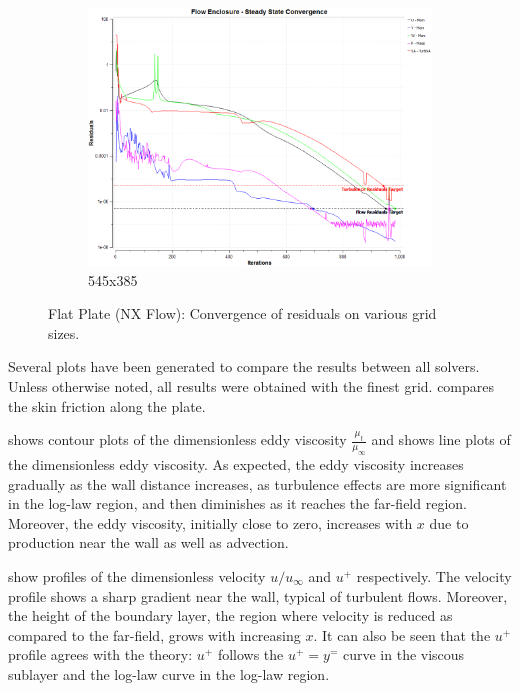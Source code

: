 \begin{figure}[ht!]
\begin{subfigure}{0.48\textwidth}
        \includegraphics[width=\textwidth]{./figs/flatnx/545x385_conv.png}
        \caption{545x385}
    \end{subfigure}
    \caption{Flat Plate (NX Flow): Convergence of residuals on various grid sizes.}
    \label{fig:nxflatcnvstudy}
\end{figure}

Several plots have been generated to compare the results between all solvers. Unless otherwise noted, all results were obtained with the finest grid.  compares the skin friction along the plate. 

 shows contour plots of the dimensionless eddy viscosity $\frac{\mu_t}{\mu_{\infty}}$ and  shows line plots of the dimensionless eddy viscosity. As expected, the eddy viscosity increases gradually as the wall distance increases, as turbulence effects are more significant in the log-law region, and then diminishes as it reaches the far-field region. Moreover, the eddy viscosity, initially close to zero, increases with $x$ due to production near the wall as well as advection.

 show profiles of the dimensionless velocity $u/u_\infty$ and $u^+$ respectively. The velocity profile shows a sharp gradient near the wall, typical of turbulent flows. Moreover, the height of the boundary layer, the region where velocity is reduced as compared to the far-field, grows with increasing $x$. It can also be seen that the $u^+$ profile agrees with the theory: $u^+$ follows the $u^+=y^=$ curve in the viscous sublayer and the log-law curve in the log-law region. 

